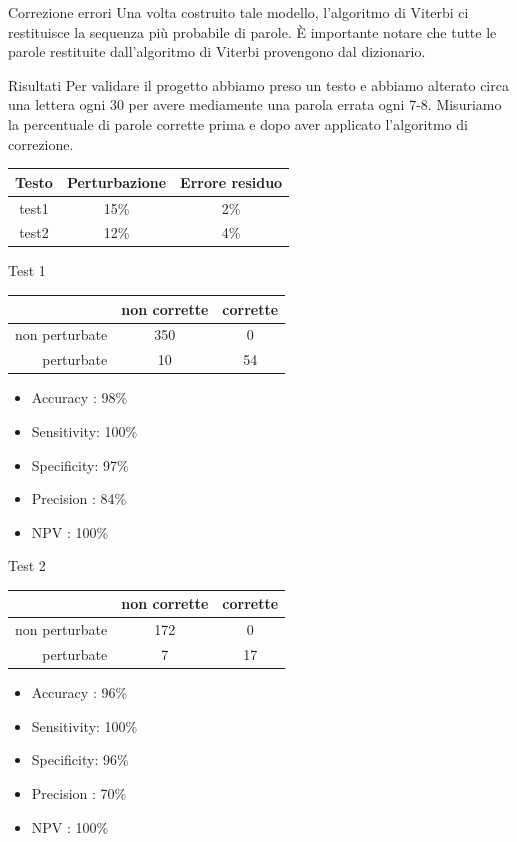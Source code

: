\documentclass[aspectratio=169]{beamer}
\begin{document}
\begin{frame}{Correzione errori}
 Una volta costruito tale modello, l'algoritmo di Viterbi ci restituisce la sequenza più probabile di parole. È importante notare che tutte le parole 
restituite dall'algoritmo di Viterbi provengono dal dizionario.
\end{frame}

\begin{frame}{Risultati}
 Per validare il progetto abbiamo preso un testo e abbiamo alterato circa una lettera ogni 30 per avere mediamente una parola errata ogni 7-8. 
Misuriamo la percentuale di parole corrette prima e dopo aver applicato l'algoritmo di correzione.\\
\vspace{0.5cm}
 
 \centering
 \begin{tabular}{c|c|c}
  \textbf{Testo} & \textbf{Perturbazione} & \textbf{Errore residuo}\\
 \hline
 	test1 & 15\% &  2\% \\
    test2 & 12\% & 4\%\\
 \end{tabular}

\end{frame}



\begin{frame}{Test 1}
\centering
\begin{tabular}{r|c|c}
	               & non corrette & corrette \\ \hline
	non perturbate & 350          & 0            \\
	perturbate     & 10           & 54           \\
\end{tabular}
\begin{itemize}
 \item Accuracy   : 98\%
 \item Sensitivity: 100\%
 \item Specificity: 97\%
 \item Precision  : 84\%
 \item NPV        : 100\%
\end{itemize}
\end{frame}

\begin{frame}{Test 2}
\centering
\begin{tabular}{r|c|c}
	               & non corrette & corrette     \\ \hline
	non perturbate & 172          & 0            \\
	perturbate     & 7            & 17           \\
\end{tabular}
\begin{itemize}
 \item Accuracy   : 96\%
 \item Sensitivity: 100\%
 \item Specificity: 96\%
 \item Precision  : 70\%
 \item NPV        : 100\%
\end{itemize}
\end{frame}  
\end{document}
